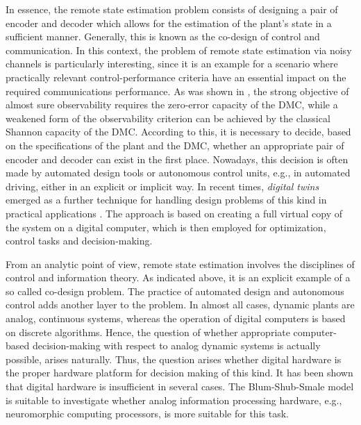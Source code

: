\documentclass[conference]{IEEEtran}
\begin{document}
	In essence, the remote state estimation problem consists of designing a pair of encoder and decoder which allows for the estimation of the plant's state in a sufficient manner.
	Generally, this is known as the co-design of control and communication. In this context, the problem of remote state estimation via noisy channels is particularly interesting,
	since it is an example for a scenario where practically relevant control-performance criteria have an essential impact on the required communications performance.
	As was shown in \cite{MS07}, the strong objective of almost sure observability requires the zero-error capacity of the DMC, while a weakened form of the observability criterion can be achieved
	by the classical Shannon capacity of the DMC.
	According to this, it is necessary to decide, based on the specifications of the plant and the DMC, whether an appropriate pair of encoder and decoder can exist in the first place. 
	Nowadays, this decision is often made by automated design tools or autonomous control units, e.g., in automated driving, either in an explicit or implicit way. In recent times, 
	\emph{digital twins} emerged as a further technique for handling design problems of this kind in practical applications \cite{RaSaKv20,TaZhLiNe19}. 
	The approach is based on creating a full virtual copy of the system on a digital computer, which is then employed for optimization, control tasks and decision-making. 

	From an analytic point of view, remote state estimation involves the disciplines of control and information theory. As indicated above, it is an explicit example of a so 
	called co-design problem. The practice of automated design and autonomous control adds another layer to the problem. In almost all cases, dynamic plants are analog, continuous  systems, 
	whereas the operation of digital computers is based on discrete algorithms. Hence, the question of whether appropriate computer-based decision-making with respect to analog 
	dynamic systems is actually possible, arises naturally. Thus, the question arises whether digital hardware is the proper hardware platform for decision making of this kind. It has been shown
	that digital hardware is insufficient in several cases. The Blum-Shub-Smale model is suitable to investigate whether analog information processing hardware, e.g., neuromorphic computing
	processors, is more suitable for this task.
\end{document}
